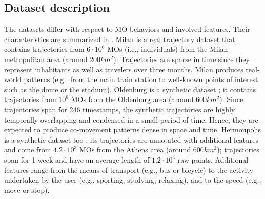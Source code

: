 \documentclass[preprint,12pt,authoryear]{elsarticle} %
\renewcommand{\sf}[1]{\textsf{\textup{#1}}}
\begin{document}
\subsection{Dataset description}
The datasets differ with respect to MO behaviors and involved features.
Their characteristics are summarized in .
\sf{Milan} is a real trajectory dataset that contains trajectories from $6 \cdot 10^6$ MOs (i.e., individuals) from the Milan metropolitan area (around $200 km^2$).
Trajectories are sparse in time since they represent inhabitants as well as travelers over three months.
\sf{Milan} produces real-world patterns (e.g., from the main train station to well-known points of interest such as the dome or the stadium).
\sf{Oldenburg} is a synthetic dataset \citep{DBLP:journals/geoinformatica/Brinkhoff02};
it contains trajectories from $10^6$ MOs from the Oldenburg area (around $600 km^2$).
Since trajectories span for 246 timestamps, %
the synthetic trajectories are highly temporally overlapping and condensed in a small period of time.
Hence, they are expected to produce co-movement patterns dense in space and time. %
\sf{Hermoupolis} is a synthetic dataset too \citep{DBLP:journals/sigspatial/PelekisSTT15}; its trajectories are annotated with additional features and come from $4.2 \cdot 10^3$ MOs from the Athens area (around $600 km^2$); trajectories span for 1 week and have an average length of $1.2 \cdot 10^4$ raw points.
Additional features range from the means of transport (e.g., bus or bicycle) to the activity undertaken by the user (e.g., sporting, studying, relaxing), and to the speed (e.g., move or stop).
\end{document}
